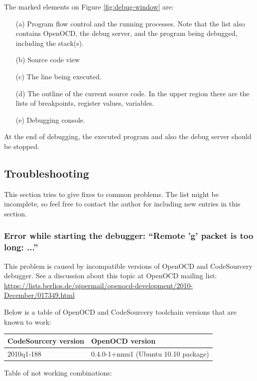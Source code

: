 \documentclass[a4paper, 10pt]{article}
\begin{document}
The marked elements on Figure \ref{fig:debug-window} are:
    \begin{itemize}
    \item[(a)] Program flow control and the running processes.
        Note that the list also contains OpenOCD, the debug server,
        and the program being debugged, including the stack(s).
    \item[(b)] Source code view
    \item[(c)] The line being executed.
    \item[(d)] The outline of the current source code.
        In the upper region there are the lists of breakpoints, register values,
        variables.
    \item[(e)] Debugging console.
    \end{itemize}

At the end of debugging, the executed program and also the
debug server should be stopped.

\subsection{Troubleshooting}

This section tries to give fixes to common problems.
The list might be incomplete, so feel free to contact the author for including
new entries in this section.

\subsubsection{Error while starting the debugger: ``Remote 'g' packet is too long: ...''}

\label{sect:gdb-problems}
This problem is caused by incompatible versions of OpenOCD and CodeSourcery debugger.
See a discussion about this topic at OpenOCD mailing list:
\url{https://lists.berlios.de/pipermail/openocd-development/2010-December/017349.html}

Below is a table of OpenOCD and CodeSourcery toolchain versions that are known to work:

    \smallskip
    \begin{tabular}{ l | l }
    CodeSourcery version & OpenOCD version \\
    \hline
    2010q1-188          &   0.4.0-1+nmu1 (Ubuntu 10.10 package) \\
    \end{tabular}
    \smallskip

Table of not working combinations:
\end{document}
